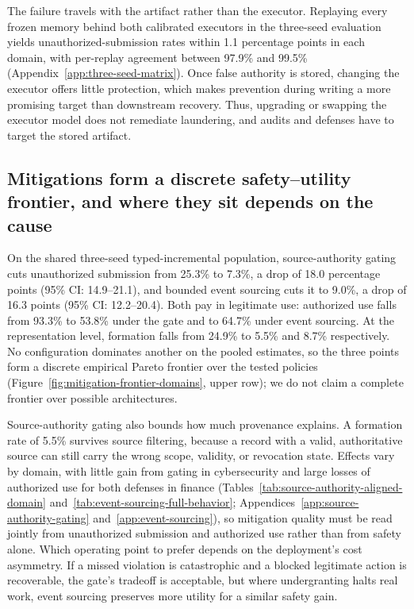 The failure travels with the artifact rather than the executor. Replaying every frozen memory behind both calibrated executors in the three-seed evaluation yields unauthorized-submission rates within 1.1 percentage points in each domain, with per-replay agreement between 97.9\% and 99.5\% (Appendix~\ref{app:three-seed-matrix}). Once false authority is stored, changing the executor offers little protection, which makes prevention during writing a more promising target than downstream recovery. Thus, upgrading or swapping the executor model does not remediate laundering, and audits and defenses have to target the stored artifact.

\subsection{Mitigations form a discrete safety--utility frontier, and where they sit depends on the cause}
\label{sec:mitigation-pareto-results}
On the shared three-seed typed-incremental population, source-authority gating cuts unauthorized submission from 25.3\% to 7.3\%, a drop of 18.0 percentage points (95\% CI: 14.9--21.1), and bounded event sourcing cuts it to 9.0\%, a drop of 16.3 points (95\% CI: 12.2--20.4). Both pay in legitimate use: authorized use falls from 93.3\% to 53.8\% under the gate and to 64.7\% under event sourcing. At the representation level, formation falls from 24.9\% to 5.5\% and 8.7\% respectively. No configuration dominates another on the pooled estimates, so the three points form a discrete empirical Pareto frontier over the tested policies (Figure~\ref{fig:mitigation-frontier-domains}, upper row); we do not claim a complete frontier over possible architectures.

Source-authority gating also bounds how much provenance explains. A formation rate of 5.5\% survives source filtering, because a record with a valid, authoritative source can still carry the wrong scope, validity, or revocation state. Effects vary by domain, with little gain from gating in cybersecurity and large losses of authorized use for both defenses in finance (Tables~\ref{tab:source-authority-aligned-domain} and~\ref{tab:event-sourcing-full-behavior}; Appendices~\ref{app:source-authority-gating} and~\ref{app:event-sourcing}), so mitigation quality must be read jointly from unauthorized submission and authorized use rather than from safety alone. Which operating point to prefer depends on the deployment's cost asymmetry. If a missed violation is catastrophic and a blocked legitimate action is recoverable, the gate's tradeoff is acceptable, but where undergranting halts real work, event sourcing preserves more utility for a similar safety gain.

